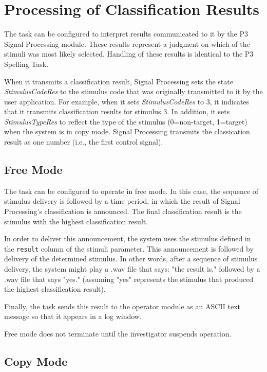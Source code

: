 \documentclass[letterpaper,oneside,12pt]{article}
\begin{document}
\section{Processing of Classification Results}

The task can be configured to interpret results communicated to it by the P3 
Signal Processing module. These results represent a judgment on which of the 
stimuli was most likely selected. Handling of these results is identical to the 
P3 Spelling Task. 

When it transmits a classification result, Signal Processing sets the state 
\emph{StimulusCodeRes} to the stimulus code that was originally transmitted to 
it by the user application. For example, when it sets \emph{StimulusCodeRes} to 
3, it indicates that it transmits classification results for stimulus 3. In 
addition, it sets \emph{StimulusTypeRes} to reflect the type of the stimulus 
(0=non-target, 1=target) when the system is in copy mode. Signal Processing 
transmits the classication result as one number (i.e., the first control signal).

\subsection{Free Mode}

The task can be configured to operate in free mode. In this case, the sequence 
of stimulus delivery is followed by a time period, in which the result of Signal 
Processing's classification is announced. The final classification result is
the stimulus with the highest classification result.

In order to deliver this announcement, the system uses the stimulus defined in 
the \texttt{result} column of the stimuli parameter. This announcement is 
followed by delivery of the determined stimulus. In other words, after a 
sequence of stimulus delivery, the system might play a .wav file that says: "the 
result is," followed by a .wav file that says "yes." (assuming "yes" represents
the stimulus that produced the highest classification result).

Finally, the task sends this result to the operator module as an ASCII text 
message so that it appears in a log window.

Free mode does not terminate until the investigator suspends operation.


\subsection{Copy Mode}
\end{document}
